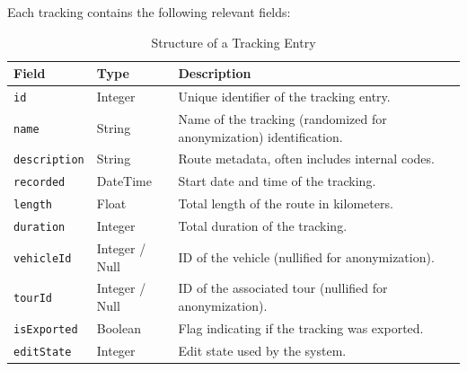 \documentclass[a4paper,12pt,twoside]{scrreprt}
\begin{document}
Each tracking contains the following relevant fields:
\begin{table}[H]
  \centering
  \begin{tabular}{|l|l|p{8cm}|}
    \hline
    \textbf{Field}       & \textbf{Type}  & \textbf{Description}
    \\
    \hline
    \texttt{id}          & Integer        & Unique identifier of the tracking
    entry.

    \\
    \hline
    \texttt{name}        & String         & Name of the tracking (randomized
    for anonymization)
    identification.
    \\
    \hline
    \texttt{description} & String         & Route metadata, often includes
    internal codes.
    \\
    \hline
    \texttt{recorded}    & DateTime       & Start date and time of the
    tracking.
    \\
    \hline
    \texttt{length}      & Float          & Total length of the route in
    kilometers.
    \\
    \hline
    \texttt{duration}    & Integer        & Total duration of the tracking.
    \\
    \hline
    \texttt{vehicleId}   & Integer / Null & ID of the vehicle (nullified for
    anonymization).
    \\
    \hline
    \texttt{tourId}      & Integer / Null & ID of the associated tour
    (nullified for anonymization).
    \\
    \hline
    \texttt{isExported}  & Boolean        & Flag indicating if the tracking was
    exported.
    \\
    \hline
    \texttt{editState}   & Integer        & Edit state used by the system.
    \\
    \hline
  \end{tabular}
  \label{tab:tracking_structure}
  \caption{Structure of a Tracking Entry}
\end{table}
\end{document}
